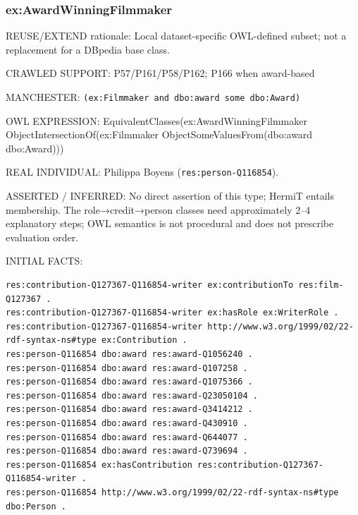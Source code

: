 \documentclass[
  11pt,
]{article}
\begin{document}
\subsubsection{\texorpdfstring{ex:\allowbreak{}\allowbreak{}Award\allowbreak{}\allowbreak{}Winning\allowbreak{}F\allowbreak{}ilmmaker\allowbreak{}}{}}\label{exawardwinningfilmmaker}

REUSE/EXTEND rationale: Local dataset-\allowbreak{}specific\allowbreak{}
OWL-defined subset; not a replacement for a DBpedia base class.

CRAWLED SUPPORT:
P57/\allowbreak{}\allowbreak{}P161\allowbreak{}/\allowbreak{}\allowbreak{}P58/\allowbreak{}\allowbreak{}P16\allowbreak{}2;
P166 when award-based

MANCHESTER:
\texttt{(ex:\allowbreak{}\allowbreak{}Film\allowbreak{}maker an\allowbreak{}d dbo:\allowbreak{}aw\allowbreak{}ard some\allowbreak{} dbo:\allowbreak{}\allowbreak{}Awa\allowbreak{}rd)}

OWL EXPRESSION:
Equivale\allowbreak{}nt\allowbreak{}Classe\allowbreak{}s(ex:\allowbreak{}\allowbreak{}Awa\allowbreak{}rd\allowbreak{}Winnin\allowbreak{}g\allowbreak{}Filmmak\allowbreak{}er
Object\allowbreak{}In\allowbreak{}tersecti\allowbreak{}on\allowbreak{}Of(ex:\allowbreak{}\allowbreak{}Filmmake\allowbreak{}r
Object\allowbreak{}So\allowbreak{}me\allowbreak{}Values\allowbreak{}\allowbreak{}From(dbo\allowbreak{}:\allowbreak{}award
dbo:Award)))

REAL INDIVIDUAL: Philippa Boyens
(\texttt{res:\allowbreak{}pers\allowbreak{}on-\allowbreak{}\allowbreak{}Q1168\allowbreak{}54}).

ASSERTED / INFERRED: No direct assertion of this type; HermiT entails
membership. The role→credit→person classes need
approxim\allowbreak{}ately 2--4 explanatory steps; OWL semantics is not
procedural and does not prescribe evaluation order.

INITIAL FACTS:

\begin{verbatim}
res:contribution-Q127367-Q116854-writer ex:contributionTo res:film-Q127367 .
res:contribution-Q127367-Q116854-writer ex:hasRole ex:WriterRole .
res:contribution-Q127367-Q116854-writer http://www.w3.org/1999/02/22-rdf-syntax-ns#type ex:Contribution .
res:person-Q116854 dbo:award res:award-Q1056240 .
res:person-Q116854 dbo:award res:award-Q107258 .
res:person-Q116854 dbo:award res:award-Q1075366 .
res:person-Q116854 dbo:award res:award-Q23050104 .
res:person-Q116854 dbo:award res:award-Q3414212 .
res:person-Q116854 dbo:award res:award-Q430910 .
res:person-Q116854 dbo:award res:award-Q644077 .
res:person-Q116854 dbo:award res:award-Q739694 .
res:person-Q116854 ex:hasContribution res:contribution-Q127367-Q116854-writer .
res:person-Q116854 http://www.w3.org/1999/02/22-rdf-syntax-ns#type dbo:Person .
\end{verbatim}
\end{document}
